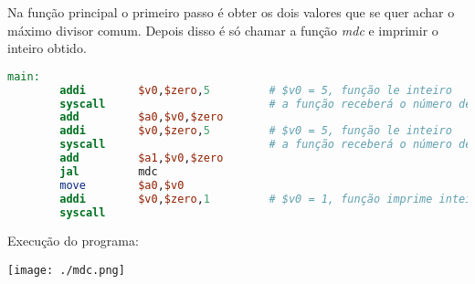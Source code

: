 \documentclass[12pt]{article}
\begin{document}
Na função principal o primeiro passo é obter os dois valores que se quer achar o máximo divisor comum. Depois disso é só chamar a função \emph{mdc} e imprimir o inteiro obtido.

\begin{lstlisting}[language = mips]
main:
        addi        $v0,$zero,5         # $v0 = 5, função le inteiro
        syscall                         # a função receberá o número de termos a serem somados
        add         $a0,$v0,$zero
        addi        $v0,$zero,5         # $v0 = 5, função le inteiro
        syscall                         # a função receberá o número de termos a serem somados
        add         $a1,$v0,$zero
        jal         mdc
        move        $a0,$v0
        addi        $v0,$zero,1         # $v0 = 1, função imprime inteiro
        syscall
\end{lstlisting}

Execução do programa:
\begin{center}
\texttt{[image: ./mdc.png]}
\end{center}
\end{document}
